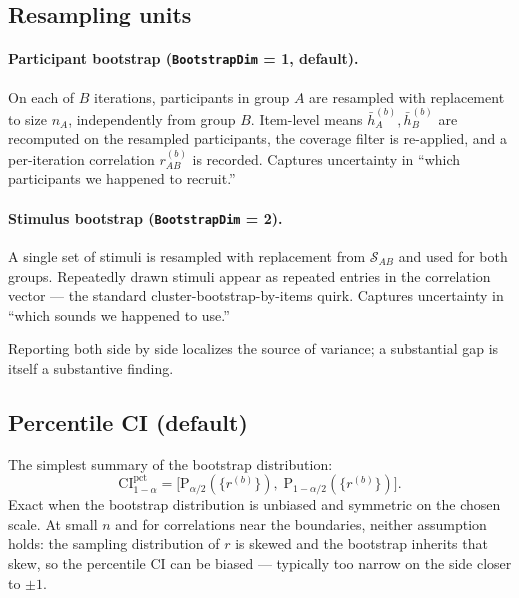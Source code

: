 \documentclass[11pt]{article}
\begin{document}
\subsection{Resampling units}
\paragraph{Participant bootstrap (\texttt{BootstrapDim} = 1, default).} On each of $B$ iterations, participants in group $A$ are resampled with replacement to size $n_A$, independently from group $B$. Item-level means $\bar h_A^{(b)},\bar h_B^{(b)}$ are recomputed on the resampled participants, the coverage filter is re-applied, and a per-iteration correlation $r^{(b)}_{AB}$ is recorded. Captures uncertainty in ``which participants we happened to recruit.''

\paragraph{Stimulus bootstrap (\texttt{BootstrapDim} = 2).} A single set of stimuli is resampled with replacement from $\mathcal{S}_{AB}$ and used for both groups. Repeatedly drawn stimuli appear as repeated entries in the correlation vector --- the standard cluster-bootstrap-by-items quirk. Captures uncertainty in ``which sounds we happened to use.''

Reporting both side by side localizes the source of variance; a substantial gap is itself a substantive finding.

\subsection{Percentile CI (default)}
\label{sec:ci-percentile}
The simplest summary of the bootstrap distribution:
\begin{equation}
\mathrm{CI}^{\mathrm{pct}}_{1-\alpha} = \bigl[\mathrm{P}_{\alpha/2}(\{r^{(b)}\}),\; \mathrm{P}_{1-\alpha/2}(\{r^{(b)}\})\bigr].
\label{eq:ci-pct}
\end{equation}
Exact when the bootstrap distribution is unbiased and symmetric on the chosen scale. At small $n$ and for correlations near the boundaries, neither assumption holds: the sampling distribution of $r$ is skewed and the bootstrap inherits that skew, so the percentile CI can be biased --- typically too narrow on the side closer to $\pm 1$.
\end{document}

